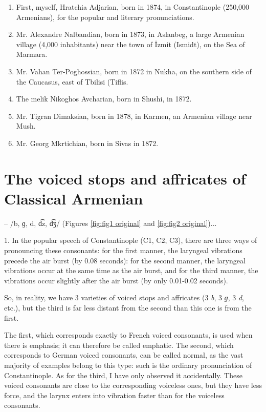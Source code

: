 \begin{enumerate}
	\item First, myself, Hratchia Adjarian, born in 1874, in Constantinople (250,000 Armenians), for the popular and literary pronunciations.
	\item Mr. Alexandre Nalbandian, born in 1873, in Aslanbeg, a large Armenian village (4,000 inhabitants) near the town of İzmit (Ismidt), on the Sea of Marmara.
	
	\item Mr. Vahan Ter-Poghossian, born in 1872 in Nukha, on the southern side of the Caucasus, east of Tbilisi (Tiflis.
	
	\item The melik Nikoghos Avcharian, born in Shushi, in 1872.
	
	\item Mr. Tigran Dimaksian, born in 1878, in Karmen, an Armenian village near Mush.
	
	\item Mr. Georg Mkrtichian, born in Sivas in 1872.
	
\end{enumerate}


\section{The voiced stops and affricates of Classical Armenian}

 – /b, ɡ, d,  d͡z,  d͡ʒ/ (Figures \ref{fig:fig1 original} and \ref{fig:fig2 original})... 

1. In the popular speech of Constantinople (C1, C2, C3), there are three ways of pronouncing these consonants: for the first manner, the laryngeal vibrations precede the air burst (by 0.08 seconds): for the second manner, the laryngeal vibrations occur at the same time as the air burst, and for the third manner, the vibrations occur slightly after the air burst (by only 0.01-0.02 seconds).

So, in reality, we have 3 varieties of voiced stops and affricates (3 \textit{b}, 3 \textit{ɡ}, 3 \textit{d}, etc.), but the third is far less distant from the second than this one is from the first.

The first, which corresponds exactly to French voiced consonants, is used when there is emphasis; it can therefore be called emphatic. The second, which corresponds to German voiced consonants, can be called normal, as the vast majority of examples belong to this type: such is the ordinary pronunciation of Constantinople. As for the third, I have only observed it accidentally. These voiced consonants are close to the corresponding voiceless ones, but they have less force, and the larynx enters into vibration faster than for the voiceless consonants.

